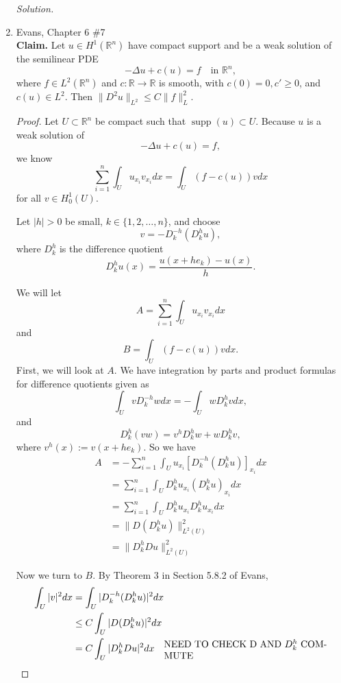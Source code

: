 \documentclass[a4paper]{article}
\newenvironment{solution}{\emph{Solution.}}{}
\newenvironment{claim}{\textbf{Claim.}}{}
\newcommand{\R}{\mathbb{R}}
\newcommand{\supp}[1]{\mathop{\mathrm{supp}}\left(#1\right)}
\begin{document}
\begin{enumerate}
\begin{solution}
    \end{solution}

  \item Evans, Chapter 6 \#7 \\
    \begin{claim}
      Let $u \in H^1(\R^n)$ have compact support and be a weak solution of the semilinear PDE
      \[ - \Delta u + c(u) = f \quad \text{in } \R^n ,\]
      where $f \in L^2(\R^n)$ and $c: \R \to \R$ is smooth, with $c(0) = 0, c' \geq 0$, and $c(u) \in L^2$. Then $\|D^2 u \|_{L^2} \leq C \|f\|_L^2$.
    \end{claim}

    \begin{proof}
      Let $U \subset \R^n$ be compact such that $\supp{u} \subset U$. Because $u$ is a weak solution of
      \[ -\Delta u + c(u) = f ,\]
      we know
      \[ \sum_{i = 1}^n \int_{U}^{} u_{x_i} v_{x_i} dx = \int_{U}^{} (f - c(u)) v dx \]
      for all $v \in H_0^1(U)$.

      Let $|h| > 0$ be small, $k \in \{1,2,\dots,n\}$, and choose
      \[ v = -D_k^{-h} (D_k^h u) ,\]
      where $D_k^h$ is the difference quotient
      \[ D_k^h u(x) = \frac{u(x + h e_k) - u(x)}{h} .\]

      We will let
      \[ A = \sum_{i=1}^n \int_{U}^{} u_{x_i} v_{x_i} dx \]
      and
      \[ B = \int_{U}^{} (f - c(u)) v dx .\]
      First, we will look at $A$.
      We have integration by parts and product formulas for difference quotients given as
      \[ \int_{U}^{} v D_k^{-h} w dx = - \int_{U}^{} w D_k^h v dx ,\]
      and
      \[ D_k^h (vw) = v^h D_k^h w + w D_k^h v ,\]
      where $v^h(x) := v(x + he_k)$.
      So we have
      \begin{align*}
        A &= - \sum_{i=1}^n \int_{U}^{} u_{x_i} \left[ D_k^{-h} (D_k^h u) \right]_{x_i} dx \\
        &= \sum_{i=1}^n \int_{U}^{} D_k^h u_{x_i} \left( D_k^h u \right)_{x_i} dx \quad \\
        &= \sum_{i=1}^n \int_{U}^{} D_k^h u_{x_i} D_k^h u_{x_i} dx \\
        & = \| D (D_k^h u) \|_{L^2(U)}^2 \\
        &= \| D_k^h Du \|_{L^2(U)}^2
      \end{align*}

      Now we turn to $B$.
      By Theorem 3 in Section 5.8.2 of Evans,
      \begin{align*}
        \int_{U}^{} |v|^2 dx &= \int_{U}^{} |D_k^{-h} (D_k^h u)|^2 dx \\
        & \leq C \int_{U}^{} |D (D_k^h u)|^2 dx \\
        &= C \int_{U}^{} |D_k^h Du|^2 dx \quad \parbox{6cm}{NEED TO CHECK D AND $D_k^h$ COMMUTE}
      \end{align*}


\end{proof}
\end{enumerate}
\end{document}
